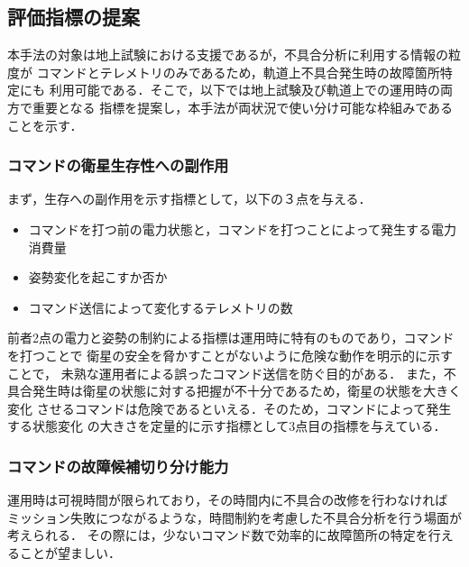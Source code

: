 \documentclass[11pt]{jsarticle}%
\begin{document}
\begin{multicols}{2}

\vspace{-1zh}
\subsection{評価指標の提案}
本手法の対象は地上試験における支援であるが，不具合分析に利用する情報の粒度が
コマンドとテレメトリのみであるため，軌道上不具合発生時の故障箇所特定にも
利用可能である．そこで，以下では地上試験及び軌道上での運用時の両方で重要となる
指標を提案し，本手法が両状況で使い分け可能な枠組みであることを示す．
\vspace{-1zh}
  \subsubsection{コマンドの衛星生存性への副作用}
  まず，生存への副作用を示す指標として，以下の３点を与える．
  \begin{itemize}
    \item コマンドを打つ前の電力状態と，コマンドを打つことによって発生する電力消費量
    \item 姿勢変化を起こすか否か
    \item コマンド送信によって変化するテレメトリの数
  \end{itemize}
  前者2点の電力と姿勢の制約による指標は運用時に特有のものであり，コマンドを打つことで
  衛星の安全を脅かすことがないように危険な動作を明示的に示すことで，
  未熟な運用者による誤ったコマンド送信を防ぐ目的がある．
  また，不具合発生時は衛星の状態に対する把握が不十分であるため，衛星の状態を大きく変化
  させるコマンドは危険であるといえる．そのため，コマンドによって発生する状態変化
  の大きさを定量的に示す指標として3点目の指標を与えている．
\vspace{-1zh}
\subsubsection{コマンドの故障候補切り分け能力}
  運用時は可視時間が限られており，その時間内に不具合の改修を行わなければ
  ミッション失敗につながるような，時間制約を考慮した不具合分析を行う場面が考えられる．
  その際には，少ないコマンド数で効率的に故障箇所の特定を行えることが望ましい．


\end{multicols}
\end{document}
